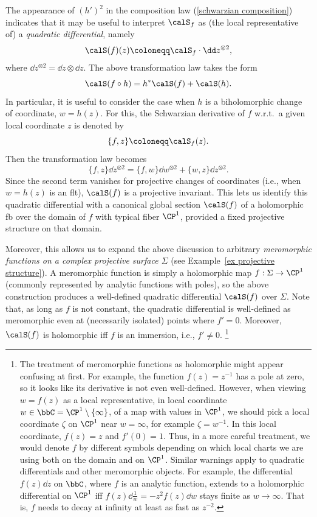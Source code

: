 \begin{rem}
    The appearance of $(h')^2$ in the composition law (\ref{schwarzian composition}) indicates that it may be useful to interpret $\calS_f$ as (the local representative of) a \emph{quadratic differential}, namely 
    \[\calS(f)(z)\coloneqq \calS_f\cdot \dd z^{\otimes 2},\] 
    where $\dd z^{\otimes 2}=\dd z\otimes \dd z$. The above transformation law takes the form 
    \[\calS(f\circ h)=h^\ast \calS(f)+\calS(h).\]
    In particular, it is useful to consider the case when $h$ is a biholomorphic change of coordinate, $w=h(z)$. For this, the Schwarzian derivative of $f$ w.r.t.\ a given local coordinate $z$ is denoted by 
    \[\{f,z\}\coloneqq \calS_f(z).\]
    Then the transformation law becomes 
    \[\{f,z\}\dd z^{\otimes 2}=\{f,w\}\dd w^{\otimes 2}+\{w,z\}\dd z^{\otimes 2}.\]
    Since the second term vanishes for projective changes of coordinates (i.e., when $w=h(z)$ is an \gls{flt}), $\calS(f)$ is a projective invariant. This lets us identify this quadratic differential with a canonical global section $\calS(f)$ of a holomorphic \gls{fb} over the domain of $f$ with typical fiber $\CP^1$, provided a fixed projective structure on that domain. 
    
    Moreover, this allows us to expand the above discussion to arbitrary \emph{meromorphic functions on a complex projective surface $\Sigma$} (see Example~\ref{ex projective structure}). A meromorphic function is simply a holomorphic map $f:\Sigma\to \CP^1$ (commonly represented by analytic functions with poles), so the above construction produces a well-defined quadratic differential $\calS(f)$ over $\Sigma$. Note that, as long as $f$ is not constant, the quadratic differential is well-defined as meromorphic even at (necessarily isolated) points where $f'=0$. Moreover, $\calS(f)$ is holomorphic iff $f$ is an immersion, i.e., $f'\neq 0$.
    \footnote{The treatment of meromorphic functions as holomorphic might appear confusing at first. For example, the function $f(z)=z^{-1}$ has a pole at zero, so it looks like its derivative is not even well-defined. However, when viewing $w=f(z)$ as a local representative, in local coordinate $w\in\bbC=\CP^1\setminus\{\infty\}$, of a map with values in $\CP^1$, we should pick a local coordinate $\zeta$ on $\CP^1$ near $w=\infty$, for example $\zeta=w^{-1}$. In this local coordinate, $f(z)=z$ and $f'(0)=1$. Thus, in a more careful treatment, we would denote $f$ by different symbols depending on which local charts we are using both on the domain and on $\CP^1$. Similar warnings apply to quadratic differentials and other meromorphic objects. For example, the differential $f(z)\dd z$ on $\bbC$, where $f$ is an analytic function, extends to a holomorphic differential on $\CP^1$ iff $f(z)\dd \frac{1}{w}=-z^2 f(z)\dd w$ stays finite as $w\to \infty$. That is, $f$ needs to decay at infinity at least as fast as $z^{-2}$. }
    

\end{rem}
